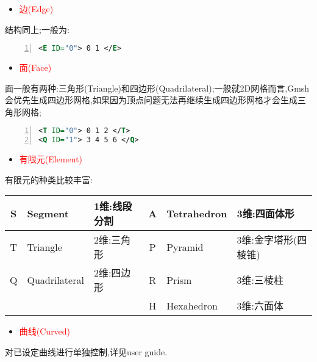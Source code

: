\begin{itemize}
	\item{\textcolor{red}{边(Edge)}}
\end{itemize}

结构同上;一般为:\par
\begin{lstlisting}[frame=single,numbers=left,language=XML]
<E ID="0"> 0 1 </E>
\end{lstlisting}
\par

\begin{itemize}
	\item{\textcolor{red}{面(Face)}}
\end{itemize}
\par
面一般有两种:三角形(Triangle)和四边形(Quadrilateral);一般就2D网格而言,Gmsh会优先生成四边形网格,如果因为顶点问题无法再继续生成四边形网格才会生成三角形网格;
\begin{lstlisting}[frame=single,numbers=left,language=XML]
<T ID="0"> 0 1 2 </T>
<Q ID="1"> 3 4 5 6 </Q>

\end{lstlisting}
\par


\begin{itemize}
	\item{\textcolor{red}{有限元(Element)}}
\end{itemize}
\par
有限元的种类比较丰富:\par
\noindent
\begin{tabular}{|c|l|l||c|l|l|}
	\hline 
	S & Segment       & 1维:线段分割 & A & Tetrahedron & 3维:四面体形 \\ 
	\hline 
	T & Triangle      & 2维:三角形   & P & Pyramid     & 3维:金字塔形(四棱锥)\\ 
	\hline 
	Q & Quadrilateral & 2维:四边形   & R & Prism       & 3维:三棱柱\\ 
	\hline
	  &               &             & H & Hexahedron  & 3维:六面体\\ 
	\hline 
\end{tabular} 



\begin{itemize}
	\item{\textcolor{red}{曲线(Curved)}}
\end{itemize}
\par
对已设定曲线进行单独控制,详见user guide.\par



